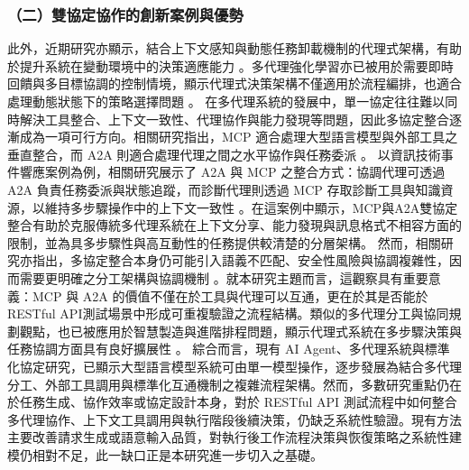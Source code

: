 \begin{ZhChapter}
\subsubsection*{（二）雙協定協作的創新案例與優勢}
\text 此外，近期研究亦顯示，結合上下文感知與動態任務卸載機制的代理式架構，有助於提升系統在變動環境中的決策適應能力 \parencite{Elmazi2026Proactive}。多代理強化學習亦已被用於需要即時回饋與多目標協調的控制情境，顯示代理式決策架構不僅適用於流程編排，也適合處理動態狀態下的策略選擇問題 \parencite{Tao2026Personalized}。
\text 在多代理系統的發展中，單一協定往往難以同時解決工具整合、上下文一致性、代理協作與能力發現等問題，因此多協定整合逐漸成為一項可行方向。相關研究指出，MCP 適合處理大型語言模型與外部工具之垂直整合，而 A2A 則適合處理代理之間之水平協作與任務委派 \parencite{Tupe2024MultiAgentCollaboration, Ehtesham2025SurveyMCPACPA2AANP}。
\text 以資訊技術事件響應案例為例，相關研究展示了 A2A 與 MCP 之整合方式：協調代理可透過 A2A 負責任務委派與狀態追蹤，而診斷代理則透過 MCP 存取診斷工具與知識資源，以維持多步驟操作中的上下文一致性 \parencite{Tupe2024MultiAgentCollaboration}。在這案例中顯示，MCP與A2A雙協定整合有助於克服傳統多代理系統在上下文分享、能力發現與訊息格式不相容方面的限制，並為具多步驟性與高互動性的任務提供較清楚的分層架構。
\text 然而，相關研究亦指出，多協定整合本身仍可能引入語義不匹配、安全性風險與協調複雜性，因而需要更明確之分工架構與協調機制 \parencite{Borghoff2025Beyond}。就本研究主題而言，這觀察具有重要意義：MCP 與 A2A 的價值不僅在於工具與代理可以互通，更在於其是否能於RESTful API測試場景中形成可重複驗證之流程結構。類似的多代理分工與協同規劃觀點，也已被應用於智慧製造與進階排程問題，顯示代理式系統在多步驟決策與任務協調方面具有良好擴展性 \parencite{Li2026AP4S}。
\text 綜合而言，現有 AI Agent、多代理系統與標準化協定研究，已顯示大型語言模型系統可由單一模型操作，逐步發展為結合多代理分工、外部工具調用與標準化互通機制之複雜流程架構。然而，多數研究重點仍在於任務生成、協作效率或協定設計本身，對於 RESTful API 測試流程中如何整合多代理協作、上下文工具調用與執行階段後續決策，仍缺乏系統性驗證。現有方法主要改善請求生成或語意輸入品質，對執行後工作流程決策與恢復策略之系統性建模仍相對不足，此一缺口正是本研究進一步切入之基礎。

\end{ZhChapter}
